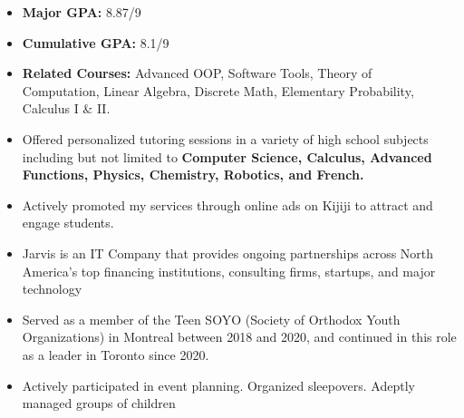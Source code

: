 \documentclass[10pt,a4paper,ragged2e,withhyper]{altacv}
\begin{document}
\begin{paracol}{2}


\begin{itemize}
\item \textbf{Major GPA:} 8.87/9
\item \textbf{Cumulative GPA:} 8.1/9
\item \textbf{Related Courses:} Advanced OOP, Software Tools, Theory of \\Computation, Linear Algebra, Discrete Math, Elementary Probability, Calculus I \& II.
\end{itemize}

{}

\begin{itemize}
\item Offered personalized tutoring sessions in a variety of high school subjects including but not limited to \textbf{Computer Science, Calculus, Advanced Functions, Physics, Chemistry, Robotics, and French.}
\item Actively promoted my services through online ads on Kijiji to attract and engage students.
\end{itemize}


\begin{itemize}
    \item Jarvis is an IT Company that provides ongoing partnerships across North America's top financing institutions, consulting firms, startups, and major technology
\end{itemize}

\begin{itemize}
    \item Served as a member of the Teen SOYO (Society of Orthodox Youth Organizations) in Montreal between 2018 and 2020, and continued in this role as a leader in Toronto since 2020.
    \item Actively participated in event planning. Organized sleepovers. Adeptly managed groups of children
\end{itemize}



\end{paracol}
\end{document}
